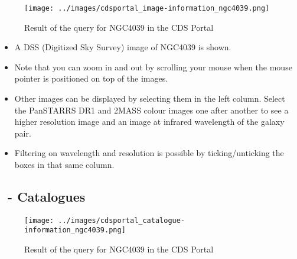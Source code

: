 \documentclass [a4paper, 12pt]{article}
\begin{document}
\begin{figure}[H]
\center
\texttt{[image: ../images/cdsportal\_image-information\_ngc4039.png]}
\caption{Result of the query for NGC4039 in the CDS Portal}
\label{fig:cdsportal3}
\end{figure}

\begin{itemize}
\item A DSS (Digitized Sky Survey) image of NGC4039 is shown.
\item Note that you can zoom in and out by scrolling your mouse when the mouse
pointer is positioned on top of the images.
\item Other images can be displayed by selecting them in the left
column. Select the PanSTARRS DR1 and 2MASS colour images one after another to
see a higher resolution image and an image at infrared wavelength of the galaxy
pair.
\item Filtering on wavelength and resolution is possible by
ticking/unticking the boxes in that same column.
\end{itemize}


\subsection{\vizier\ - Catalogues}


\begin{figure}[H]
\center
\texttt{[image: ../images/cdsportal\_catalogue-information\_ngc4039.png]}
\caption{Result of the query for NGC4039 in the CDS Portal}
\label{fig:cdsportal4}
\end{figure}
\end{document}
